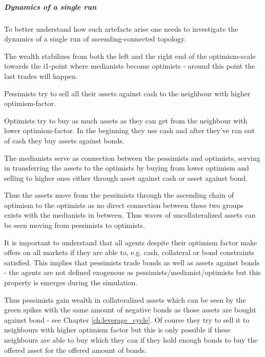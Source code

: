 \documentclass[Bachelorarbeit.tex]{subfiles}
\begin{document}
\subparagraph{Dynamics of a single run}
To better understand how such artefacts arise one needs to investigate the dynamics of a single run of ascending-connected topology.

\medskip 

The wealth stabilizes from both the left and the right end of the optimism-scale towards the i1-point where medianists become optimists - around this point the last trades will happen.

\medskip 

Pessimists try to sell all their assets against cash to the neighbour with higher optimism-factor.

\medskip 

Optimists try to buy as much assets as they can get from the neighbour with lower optimism-factor. In the beginning they use cash and after they've ran out of cash they buy assets against bonds.

\medskip 

The medianists serve as connection between the pessimists and optimists, serving in transferring the assets to the optimists by buying from lower optimism and selling to higher ones either through asset against cash or asset against bond.

\medskip 

Thus the assets move from the pessimists through the ascending chain of optimism to the optimists as no direct connection between these two groups exists with the medianists in between. Thus waves of uncollateralized assets can be seen moving from pessimists to optimists.

\medskip 

It is important to understand that all agents despite their optimism factor make offers on all markets if they are able to, e.g. cash, collateral or bond constraints satisfied. This implies that pessimists trade bonds as well as assets against bonds - the agents are not defined exogenous as pessimists/medianist/optimists but this property is emerges during the simulation.

\medskip 

Thus pessimists gain wealth in collateralized assets which can be seen by the green spikes with the same amount of negative bonds as those assets are bought against bond - see Chapter \ref{ch:leverage_cycle}. Of course they try to sell it to neighbours with higher optimism factor but this is only possible if these neighbours are able to buy which they can if they hold enough bonds to buy the offered asset for the offered amount of bonds.
\end{document}
